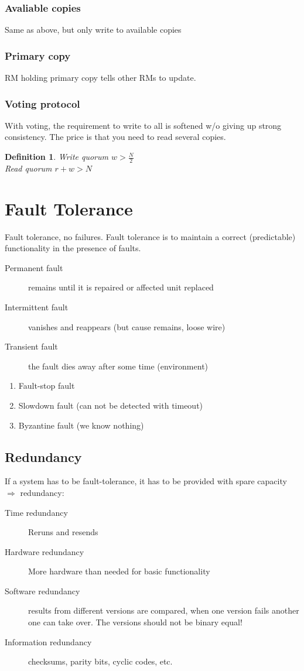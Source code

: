 \documentclass[a4paper]{article}
\newtheorem{definition}{Definition}
\begin{document}
\subsubsection{Avaliable copies}
Same as above, but only write to available copies

\subsubsection{Primary copy}
RM holding primary copy tells other RMs to update.
\subsubsection{Voting protocol}
With voting, the requirement to write to all is softened w/o giving up strong
consistency. The price is that you need to read several copies.
\begin{definition}
		Write quorum $w > \frac{N}{2}$\\
		Read quorum $r+w>N$
\end{definition}
\section{Fault Tolerance}
Fault tolerance, no failures. Fault tolerance is to maintain a correct
(predictable) functionality in the presence of faults.\\
\begin{description}
		\item[Permanent fault] remains until it is repaired or affected unit
				replaced
		\item[Intermittent fault] vanishes and reappears (but cause remains,
				loose wire)
		\item[Transient fault] the fault dies away after some time (environment)
\end{description}
\begin{enumerate}
		\item Fault-stop fault
		\item Slowdown fault (can not be detected with timeout)
		\item Byzantine fault (we know nothing)
\end{enumerate}
\subsection{Redundancy}
If a system has to be fault-tolerance, it has to be provided with spare capacity
$\Rightarrow$ redundancy:
\begin{description}
		\item[Time redundancy] Reruns and resends
		\item[Hardware redundancy] More hardware than needed for basic
				functionality
		\item[Software redundancy] results from different versions are compared,
				when one version fails another one can take over. The versions
				should not be binary equal!
		\item[Information redundancy] checksums, parity bits, cyclic codes, etc.
\end{description}
\end{document}

